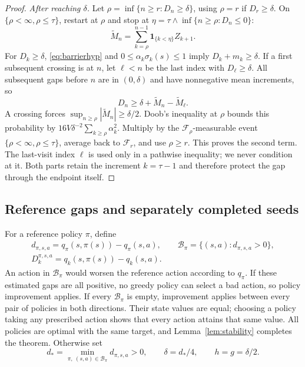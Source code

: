 \begin{proof}
\emph{After reaching $\delta$.} Let $\rho=\inf\{n\ge r:D_n\ge\delta\}$, using $\rho=r$ if $D_r\ge\delta$. On $\{\rho<\infty,\rho\le\tau\}$,
restart at $\rho$ and stop at $\eta=\tau\wedge\inf\{n\ge\rho:D_n\le0\}$:
\[
\widetilde M_n=\sum_{k=\rho}^{n-1}\mathbf1_{\{k<\eta\}}Z_{k+1}.
\]
For $D_k\ge\delta$, \eqref{eq:barrierhyp} and $0\le\alpha_k\sigma_k(s)\le1$ imply $D_k+m_k\ge\delta$. If a first subsequent crossing is
at $n$, let $\ell<n$ be the last index with $D_\ell\ge\delta$. All subsequent gaps before $n$ are in $(0,\delta)$ and
have nonnegative mean increments, so
\[
D_n\ge\delta+\widetilde M_n-\widetilde M_\ell.
\]
A crossing forces $\sup_{n\ge\rho}|\widetilde M_n|\ge\delta/2$. Doob's inequality at $\rho$ bounds this probability by
$16V\delta^{-2}\sum_{k\ge\rho}\alpha_k^2$. Multiply by the $\mathcal F_\rho$-measurable event $\{\rho<\infty,\rho\le\tau\}$, average back to $\mathcal F_r$,
and use $\rho\ge r$. This proves the second term. The last-visit index $\ell$ is used only in a pathwise
inequality; we never condition at it. Both parts retain the increment $k=\tau-1$ and therefore
protect the gap through the endpoint itself.
\end{proof}

\subsection{Reference gaps and separately completed seeds}
For a reference policy $\pi$, define
\begin{equation}\label{eq:gaps}
\begin{gathered}
d_{\pi,s,a}=q_\pi(s,\pi(s))-q_\pi(s,a),\qquad
\mathcal B_\pi=\{(s,a):d_{\pi,s,a}>0\},\\
D_k^{\pi,s,a}=q_k(s,\pi(s))-q_k(s,a).
\end{gathered}
\end{equation}
An action in $\mathcal B_\pi$ would worsen the reference action according to $q_\pi$. If these estimated gaps
are all positive, no greedy policy can select a bad action, so policy improvement applies. If
every $\mathcal B_\pi$ is empty, improvement applies between every pair of policies in both directions.
Their state values are equal; choosing a policy taking any prescribed action shows that every
action attains that same value. All policies are optimal with the same target, and Lemma~\ref{lem:stability}
completes the theorem. Otherwise set
\begin{equation}\label{eq:constants}
d_* = \min_{\pi,\ (s,a)\in\mathcal B_\pi}d_{\pi,s,a}>0,\qquad
\delta=d_*/4,\qquad h=g=\delta/2.
\end{equation}

